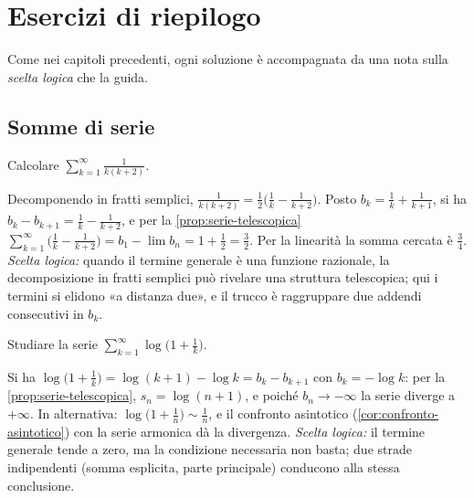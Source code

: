 \section{Esercizi di riepilogo}
\label{sec:esercizi-cap11}

Come nei capitoli precedenti, ogni soluzione è accompagnata da una nota sulla
\emph{scelta logica} che la guida.

\subsection*{Somme di serie}

\begin{esercizio}
Calcolare $\displaystyle\sum_{k=1}^{\infty}\frac1{k(k+2)}$.
\begin{soluzione}
Decomponendo in fratti semplici, $\frac1{k(k+2)}=\frac12\bigl(\frac1k-\frac1{k+2}\bigr)$. Posto
$b_{k}=\frac1k+\frac1{k+1}$, si ha $b_{k}-b_{k+1}=\frac1k-\frac1{k+2}$, e per la \cref{prop:serie-telescopica}
$\sum_{k=1}^{\infty}\bigl(\frac1k-\frac1{k+2}\bigr)=b_{1}-\lim b_{n}=1+\frac12=\frac32$. Per la linearità la somma
cercata è $\frac34$. \emph{Scelta logica:} quando il termine generale è una funzione razionale,
la decomposizione in fratti semplici può rivelare una struttura telescopica; qui i
termini si elidono «a distanza due», e il trucco è raggruppare due addendi consecutivi
in $b_{k}$.
\end{soluzione}
\end{esercizio}

\begin{esercizio}
Studiare la serie $\sum_{k=1}^{\infty}\log\bigl(1+\frac1k\bigr)$.
\begin{soluzione}
Si ha $\log\bigl(1+\frac1k\bigr)=\log(k+1)-\log k=b_{k}-b_{k+1}$ con $b_{k}=-\log k$: per la
\cref{prop:serie-telescopica}, $s_{n}=\log(n+1)$, e poiché $b_{n}\to-\infty$ la serie diverge a
$+\infty$. In alternativa: $\log\bigl(1+\frac1n\bigr)\sim\frac1n$, e il confronto asintotico
(\cref{cor:confronto-asintotico}) con la serie armonica dà la divergenza.
\emph{Scelta logica:} il termine generale tende a zero, ma la condizione necessaria non
basta; due strade indipendenti (somma esplicita, parte principale) conducono alla stessa
conclusione.
\end{soluzione}
\end{esercizio}


